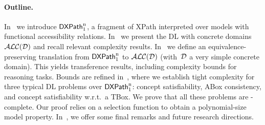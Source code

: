 \paragraph*{Outline.} In~ we introduce $\mathsf{DXPath}_{\rm 1}^{\rm n}$, a fragment of XPath interpreted over models with functional accessibility relations. In~ we present the DL with concrete domains $\mathcal{ALC(D)}$ and recall relevant complexity results. In~ we define an equivalence-preserving translation from $\mathsf{DXPath}_{\rm 1}^{\rm n}$ to $\mathcal{ALC(D)}$ (with~$\mathcal{D}$ a very simple concrete domain). This yields transference results, including complexity bounds for reasoning tasks. Bounds are refined in~, where we establish tight complexity for three typical DL problems over $\mathsf{DXPath}_{\rm 1}^{\rm n}$: concept satisfiability, ABox consistency, and concept satisfiability w.r.t.\ a TBox. We prove that all these problems are \np-complete. Our proof relies on a selection function to obtain a polynomial-size model property. In~, we offer some final remarks and future research directions.
